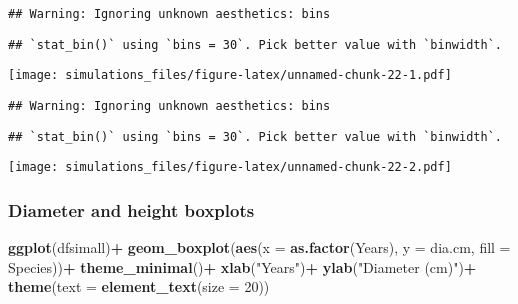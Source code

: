 \documentclass[]{article}
\newenvironment{Shaded}{\begin{snugshade}}{\end{snugshade}}
\newcommand{\KeywordTok}[1]{\textcolor[rgb]{0.13,0.29,0.53}{\textbf{#1}}}
\newcommand{\DataTypeTok}[1]{\textcolor[rgb]{0.13,0.29,0.53}{#1}}
\newcommand{\DecValTok}[1]{\textcolor[rgb]{0.00,0.00,0.81}{#1}}
\newcommand{\StringTok}[1]{\textcolor[rgb]{0.31,0.60,0.02}{#1}}
\newcommand{\OperatorTok}[1]{\textcolor[rgb]{0.81,0.36,0.00}{\textbf{#1}}}
\newcommand{\NormalTok}[1]{#1}
\begin{document}
\begin{verbatim}
## Warning: Ignoring unknown aesthetics: bins
\end{verbatim}

\begin{verbatim}
## `stat_bin()` using `bins = 30`. Pick better value with `binwidth`.
\end{verbatim}

\texttt{[image: simulations\_files/figure-latex/unnamed-chunk-22-1.pdf]}

\begin{Shaded}
\end{Shaded}

\begin{verbatim}
## Warning: Ignoring unknown aesthetics: bins
\end{verbatim}

\begin{verbatim}
## `stat_bin()` using `bins = 30`. Pick better value with `binwidth`.
\end{verbatim}

\texttt{[image: simulations\_files/figure-latex/unnamed-chunk-22-2.pdf]}

\subsubsection{Diameter and height
boxplots}\label{diameter-and-height-boxplots}

\begin{Shaded}
\begin{Highlighting}[]
\KeywordTok{ggplot}\NormalTok{(dfsimall)}\OperatorTok{+}
\StringTok{  }\KeywordTok{geom_boxplot}\NormalTok{(}\KeywordTok{aes}\NormalTok{(}\DataTypeTok{x =} \KeywordTok{as.factor}\NormalTok{(Years), }\DataTypeTok{y =}\NormalTok{ dia.cm, }\DataTypeTok{fill =}\NormalTok{ Species))}\OperatorTok{+}
\StringTok{  }\KeywordTok{theme_minimal}\NormalTok{()}\OperatorTok{+}
\StringTok{  }\KeywordTok{xlab}\NormalTok{(}\StringTok{"Years"}\NormalTok{)}\OperatorTok{+}
\StringTok{  }\KeywordTok{ylab}\NormalTok{(}\StringTok{"Diameter (cm)"}\NormalTok{)}\OperatorTok{+}
\StringTok{  }\KeywordTok{theme}\NormalTok{(}\DataTypeTok{text =} \KeywordTok{element_text}\NormalTok{(}\DataTypeTok{size =} \DecValTok{20}\NormalTok{))}
\end{Highlighting}
\end{Shaded}
\end{document}
